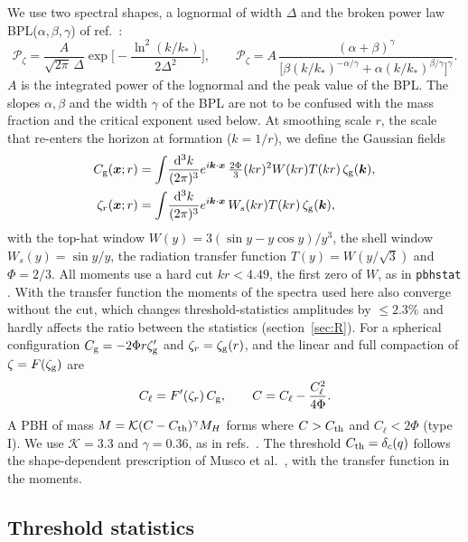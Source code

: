 \documentclass[a4paper,11pt]{article}
\newcommand{\Cg}{C_{\rm g}}
\newcommand{\Cl}{C_{\ell}}
\newcommand{\zr}{\zeta_r}
\newcommand{\zg}{\zeta_{\rm g}}
\newcommand{\dd}{\mathrm{d}}
\newcommand{\Pz}{\mathcal{P}_\zeta}
\begin{document}
We use two spectral shapes, a lognormal of width $\Delta$ and the broken power law
BPL($\alpha,\beta,\gamma$) of ref.~\cite{FIVT23}:
\begin{equation}
\Pz=\frac{A}{\sqrt{2\pi}\,\Delta}\exp\Big[-\frac{\ln^2(k/k_*)}{2\Delta^2}\Big],\qquad
\Pz=A\,\frac{(\alpha+\beta)^\gamma}{\big[\beta(k/k_*)^{-\alpha/\gamma}+\alpha(k/k_*)^{\beta/\gamma}\big]^\gamma}.
\label{eq:spectra}
\end{equation}
$A$ is the integrated power of the lognormal and the peak value of the BPL. The slopes
$\alpha,\beta$ and the width $\gamma$ of the BPL are not to be confused with the mass fraction and
the critical exponent used below. At smoothing scale $r$, the scale that re-enters the horizon at
formation ($k=1/r$), we define the Gaussian fields
\begin{align}
\Cg(\bm x;r)&=\int\!\frac{\dd^3k}{(2\pi)^3}e^{i\bm k\cdot\bm x}\,\tfrac{2\Phi}{3}(kr)^2W(kr)T(kr)\,\zg(\bm k),\\
\zr(\bm x;r)&=\int\!\frac{\dd^3k}{(2\pi)^3}e^{i\bm k\cdot\bm x}\,W_s(kr)T(kr)\,\zg(\bm k),
\end{align}
with the top-hat window $W(y)=3(\sin y-y\cos y)/y^3$, the shell window $W_s(y)=\sin y/y$, the
radiation transfer function $T(y)=W(y/\sqrt3)$ and $\Phi=2/3$. All moments use a hard cut
$kr<4.49$, the first zero of $W$, as in \texttt{pbhstat} \cite{ColeFumagalli}. With the transfer
function the moments of the spectra used here also converge without the cut, which changes
threshold-statistics amplitudes by $\le2.3\%$ and hardly affects the ratio between the statistics
(section~\ref{sec:R}). For a spherical configuration $\Cg=-2\Phi r\zg'$ and $\zr=\zg(r)$, and the
linear and full compaction of $\zeta=F(\zg)$ are \cite{Young19,DeLuca19,Ferrante,Young22}
\begin{equation}
\Cl=F'(\zr)\,\Cg,\qquad C=\Cl-\frac{\Cl^2}{4\Phi}.
\label{eq:Cl}
\end{equation}
A PBH of mass $M=\mathcal K(C-C_{\rm th})^\gamma M_H$ \cite{EC94,NJ98,MM13} forms where
$C>C_{\rm th}$ and $\Cl<2\Phi$ (type I). We use $\mathcal K=3.3$ and $\gamma=0.36$, as in
refs.~\cite{Ferrante,Ianniccari}. The threshold $C_{\rm th}=\delta_c(q)$ follows the
shape-dependent prescription of Musco et al.~\cite{Musco19,EGS20,Musco21}, with the transfer
function in the moments.

\subsection{Threshold statistics}
\end{document}
